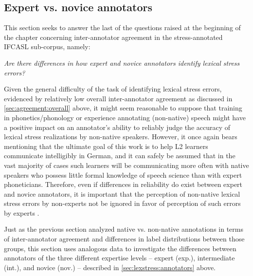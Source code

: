 		
		\subsection{Expert vs. novice annotators}
		\label{sec:agreement:expert}
		
		
		
	 This section seeks to answer the last of the questions raised at the beginning of the chapter concerning inter-annotator agreement in the stress-annotated IFCASL sub-corpus, namely:
	
	\textit{Are there differences in how expert and novice annotators identify lexical stress errors?}
	
	Given the general difficulty of the task of identifying lexical stress errors, evidenced by relatively low overall inter-annotator agreement as discussed in \cref{sec:agreement:overall} above, it might seem reasonable to suppose that training in phonetics/phonology or experience annotating (non-native) speech might have a positive impact on an annotator's ability to reliably judge the accuracy of lexical stress realizations by non-native speakers. However, it once again bears mentioning that the ultimate goal of this work is to help L2 learners communicate intelligibly in German, and it can safely be assumed that in the vast majority of cases such learners will be communicating more often with native speakers who possess little formal knowledge of speech science than with expert phoneticians. Therefore, even if differences in reliability do exist between expert and novice annotators, it is important that the perception of non-native lexical stress errors by non-experts not be ignored in favor of perception of such errors by experts . 
	

	
	Just as the previous section analyzed native vs. non-native annotations in terms of inter-annotator agreement and differences in label distributions between those groups, this section uses analogous data to investigate the differences between annotators of the three different expertise levels -- expert (exp.), intermediate (int.), and novice (nov.) -- described in \cref{sec:lexstress:annotators} above.
	
